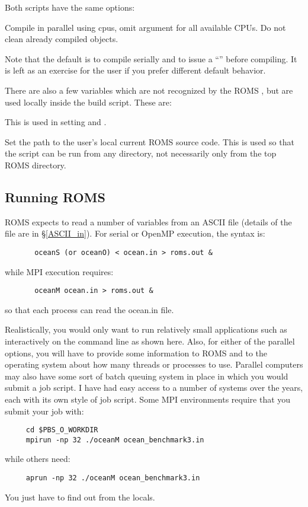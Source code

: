 \begin{itemize}
Both scripts have the same options:
\begin{klist}
   Compile in parallel using  cpus,
  omit argument for all available CPUs.
      Do not clean already compiled objects.
\end{klist}
Note that the default is to compile serially and to issue a
``'' before compiling. It is left as an exercise
for the user if you prefer different default behavior.

There are also a few variables which are not recognized by the ROMS
, but are used locally inside the build script. These
are:
\begin{klist}
 This is used in setting
 and .

 Set the path to the user's local current ROMS source
code. This is used so that the script can be run from any directory,
not necessarily only from the top ROMS directory.
\end{klist}

\subsection{Running ROMS}
\label{Running}
ROMS expects to read a number of variables from an ASCII file
(details of the file are in \S\ref{ASCII_in}).
For serial or OpenMP execution, the syntax is:
\begin{verbatim}
       oceanS (or oceanO) < ocean.in > roms.out &
\end{verbatim}
while MPI execution requires:
\begin{verbatim}
       oceanM ocean.in > roms.out &
\end{verbatim}
so that each process can read the ocean.in file.

Realistically, you would only want to run relatively small
applications such as  interactively on the command
line as shown here. Also, for either of the parallel options, you
will have to provide some information to ROMS and to the operating
system about how many threads or processes to use. Parallel
computers may also have some sort of batch queuing system in place
in which you would submit a job script. I have had easy access to a
number of systems over the years,
each with its own style of job script. Some MPI environments
require that you submit your job with:
\begin{verbatim}
     cd $PBS_O_WORKDIR
     mpirun -np 32 ./oceanM ocean_benchmark3.in
\end{verbatim}
while others need:
\begin{verbatim}
     aprun -np 32 ./oceanM ocean_benchmark3.in
\end{verbatim}
You just have to find out from the locals.


\end{itemize}
